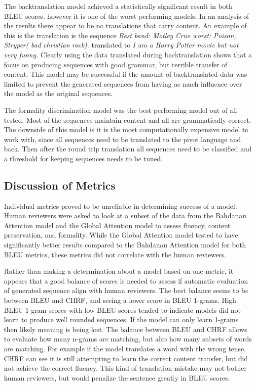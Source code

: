 \documentclass[12pt]{article}
\begin{document}
The backtranslation model achieved a statistically significant result in both BLEU scores, 
however it is one of the worst performing models. In an analysis of the results there 
appear to be no translations that carry content. An example of this is the translation 
is the sequence \textit{Best band: Motley Crue worst: Poison, Stryper( bad christian rock).} 
translated to \textit{I am a Harry Potter movie but not very funny.} Clearly using the data translated 
during backtranslation shows that a focus on producing sequences with good grammar, but terrible transfer
of content. This model may be successful if the amount of backtranslated data was limited to prevent 
the generated sequences from having as much influence over the model as the original sequences. \par 

The formality discrimination model was the best performing model out of all tested. Most of the sequences
maintain content and all are grammatically correct. The downside of this model is it is the most computationally
expensive model to work with, since all sequences need to be translated to the pivot language and back. 
Then after the round trip translation all sequences need to be classified and a threshold for keeping
sequences needs to be tuned. 

\subsection{Discussion of Metrics}

Individual metrics proved to be unreliable in determining success of a model.
Human reviewers were asked to look at a subset of the data from the Bahdanau Attention model
and the Global Attention model to assess fluency, content preservation, and formality. While the 
Global Attention model tested to have significantly better results compared to the Bahdanau Attention model
for both BLEU metrics, these metrics did not correlate with the human reviewers. \par

Rather than making a determination about a model based on one metric, it appears that a good balance of scores 
is needed to assess 
if automatic evaluation of generated sequence align with human reviewers. The best balance seems to be 
between BLEU 
and CHRF, and seeing a lower score in BLEU 1-grams. High BLEU 1-gram scores with low BLEU scores tended 
to indicate models did not learn to produce well rounded sequences. If the model
can only learn 1-grams then likely meaning is being lost. The balance between BLEU and CHRF allows
to evaluate how many n-grams are matching, but also how many subsets of words are matching. For example
if the model translates a word with the wrong tense, CHRF can see it is still attempting to learn 
the correct content transfer, but did not achieve the correct fluency. This kind of translation mistake
may not bother human reviewers, but would penalize the sentence greatly in BLEU scores. \par
\end{document}
